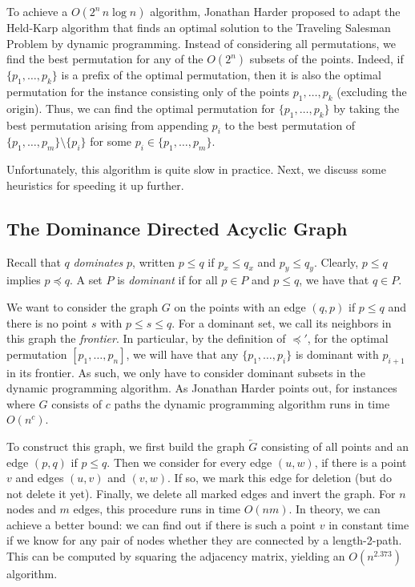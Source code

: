 \documentclass[11pt, a4paper, twocolumn]{article}
\begin{document}
To achieve a $O(2^n\, n\log n)$ algorithm, Jonathan Harder \cite{harder2019anchoredrectanglecover}
proposed to adapt the Held-Karp algorithm that finds an optimal solution to the Traveling Salesman Problem
by dynamic programming. Instead of considering all permutations, we find the best permutation for
any of the $O(2^n)$ subsets of the points. Indeed, if $\{p_1, \dots, p_k\}$ is a prefix of the optimal permutation,
then it is also the optimal permutation for the instance consisting only of the points $p_1, \dots, p_k$ (excluding
the origin). Thus, we can find the optimal permutation for $\{p_1, \dots, p_k\}$ by taking the best
permutation arising from appending $p_i$ to the best permutation of $\{p_1, \dots, p_m\} \setminus \{p_i\}$
for some $p_i \in \{p_1, \dots, p_m\}$.

Unfortunately, this algorithm is quite slow in practice.
Next, we discuss some heuristics for speeding it up further.

\subsection{The Dominance Directed Acyclic Graph}

Recall that $q$ \textit{dominates} $p$, written $p \leq q$ if
$p_x \leq q_x$ and $p_y \leq q_y$. Clearly, $p \leq q$ implies $p \preceq q$.
A set $P$ is \textit{dominant} if for all $p \in P$ and $p \leq q$,
we have that $q \in P$.

We want to consider the graph $G$ on the points with an edge $(q, p)$ if $p \leq q$
and there is no point $s$ with $p \leq s \leq q$. For a dominant set, we call its
neighbors in this graph the \textit{frontier}. In particular, by the definition of $\preceq'$,
for the optimal permutation $[p_1, \dots, p_n]$, we will have that
any $\{p_1, \dots, p_i\}$ is dominant with $p_{i+1}$ in its frontier. As such, we
only have to consider dominant subsets in the dynamic programming algorithm.
As Jonathan Harder points out, for instances where $G$ consists of $c$ paths
the dynamic programming algorithm runs in time $O(n^c)$.

To construct this graph, we first build the graph $\overleftarrow{G}$ consisting of all points and an edge $(p, q)$
if $p \leq q$. Then we consider for every edge $(u, w)$, if there is a point $v$ and edges $(u, v)$ and $(v, w)$.
If so, we mark this edge for deletion (but do not delete it yet). Finally, we delete all marked edges
and invert the graph. For $n$ nodes and $m$ edges, this procedure runs in time $O(nm)$.
In theory, we can achieve a better bound:
we can find out if there is such a point $v$ in constant time if we know for any pair of
nodes whether they are connected by a length-2-path.
This can be computed by squaring the adjacency matrix, yielding an $O(n^{2.373})$ algorithm.
\end{document}
